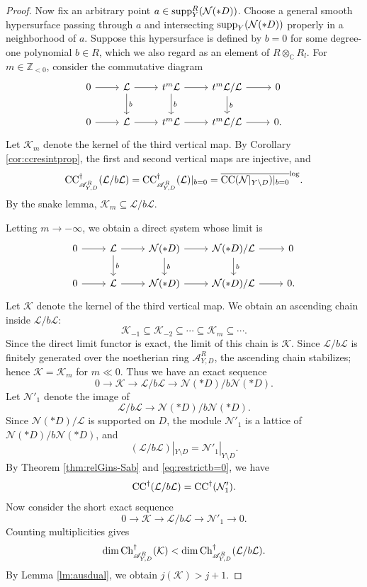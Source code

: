 \documentclass{amsart}
\theoremstyle{plain}
\numberwithin{theorem}{section}
\theoremstyle{definition}
\theoremstyle{remark}
\theoremstyle{definition}
\newcommand{\C}{\mathbb{C}} %
\newcommand{\Z}{\mathbb{Z}}
\newcommand{\cK}{\mathcal{K}}
\newcommand{\cL}{\mathcal{L}}
\newcommand{\cN}{\mathcal{N}}
\newcommand{\sA}{\mathscr{A}}
\newcommand{\supp}{\textup{supp}}
\newcommand{\Ch}{\textup{Ch}}
\newcommand{\CC}{\textup{CC}}
\begin{document}
\begin{proof}
Now fix an arbitrary point
$a\in \supp^R_Y(\cN(*D))$.
Choose a general smooth hypersurface passing through $a$ and intersecting $\supp_Y(\cN(*D))$ properly in a neighborhood of $a$. Suppose this hypersurface is defined by $b=0$ for some degree-one polynomial $b\in R$, which we also regard as an element of $R\otimes_\C R_l$. For $m\in \Z_{<0}$, consider the commutative diagram
\[
\begin{tikzcd}
0\arrow[r]&
\cL\arrow[r]\arrow[d,"b"]&
t^{m}\cL\arrow[r]\arrow[d,"b"]&
{t^{m}\cL}/{\cL}\arrow[r]\arrow[d,"b"]&
0\\
0\arrow[r]&
\cL\arrow[r]&
t^{m}\cL\arrow[r]&
{t^{m}\cL}/{\cL}\arrow[r]&
0.
\end{tikzcd}
\]
Let $\cK_m$ denote the kernel of the third vertical map. By Corollary \ref{cor:ccresintprop}, the first and second vertical maps are injective, and
\begin{equation}\label{eq:restrictb=0}
\CC^\dagger_{\sA_{Y,D}^R}(\cL/b\cL)
=
\CC^\dagger_{\sA_{Y,D}^R}(\cL)|_{b=0}
=
\overline{\CC(\cN|_{Y\setminus D})|_{b=0}}^{\log}.
\end{equation}
By the snake lemma,
$\cK_m\subseteq \cL/b\cL.$

Letting $m\to -\infty$, we obtain a direct system whose limit is
\[
\begin{tikzcd}
0\arrow[r]&
\cL\arrow[r]\arrow[d,"b"]&
\cN(*D)\arrow[r]\arrow[d,"b"]&
{\cN(*D)}/{\cL}\arrow[r]\arrow[d,"b"]&
0\\
0\arrow[r]&
\cL\arrow[r]&
\cN(*D)\arrow[r]&
{\cN(*D)}/{\cL}\arrow[r]&
0.
\end{tikzcd}
\]
Let $\cK$ denote the kernel of the third vertical map. We obtain an ascending chain inside $\cL/b\cL$:
\[
\cK_{-1}\subseteq \cK_{-2}\subseteq \cdots \subseteq \cK_m\subseteq \cdots.
\]
Since the direct limit functor is exact, the limit of this chain is $\cK$. Since $\cL/b\cL$ is finitely generated over the noetherian ring $\sA^R_{Y,D}$, the ascending chain stabilizes; hence
$\cK=\cK_m$
for $m\ll 0$. Thus we have an exact sequence
\[
0\to
\cK
\to
\cL/b\cL
\to
\cN(*D)/b\cN(*D).
\]
Let $\cN'_1$ denote the image of
\[
\cL/b\cL\to \cN(*D)/b\cN(*D).
\]
Since $\cN(*D)/\cL$ is supported on $D$, the module $\cN'_1$ is a lattice of $\cN(*D)/b\cN(*D)$, and
\[
(\cL/b\cL)|_{Y\setminus D}
=
\cN'_1|_{Y\setminus D}.
\]
By Theorem \ref{thm:relGins-Sab} and \eqref{eq:restrictb=0}, we have
\[
\CC^\dagger(\cL/b\cL)=\CC^\dagger(\cN'_1).
\]
Now consider the short exact sequence
\[
0\to
\cK
\to
\cL/b\cL
\to
\cN'_1
\to0.
\]
Counting multiplicities gives
\[
\dim\Ch^\dagger_{\sA_{Y,D}^R}(\cK)
<
\dim\Ch^\dagger_{\sA_{Y,D}^R}(\cL/b\cL).
\]
By Lemma \ref{lm:ausdual}, we obtain
$j(\cK)>j+1.$


\end{proof}
\end{document}
